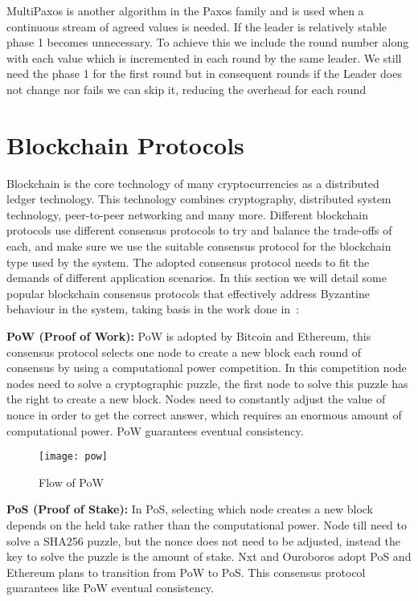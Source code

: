 MultiPaxos is another algorithm in the Paxos family and is used when a
continuous stream of agreed values is needed.
If the leader is relatively stable phase 1 becomes unnecessary. To achieve this
we include the round number along with each value which is incremented in each round
by the same leader. We still need the phase 1 for the first round but in
consequent rounds if the Leader does not change nor fails we can skip it, reducing
the overhead for each round

\section{Blockchain Protocols}\label{sec:blockchain}

Blockchain is the core technology of many cryptocurrencies as a distributed
ledger technology. This technology combines cryptography, distributed system
technology, peer-to-peer networking and many more. Different blockchain
protocols use different consensus protocols to try and balance the trade-offs of
each, and make sure we use the suitable consensus protocol for the blockchain type
used by the system. The adopted consensus protocol needs to fit the demands of
different application scenarios. In this section we will detail some popular
blockchain consensus protocols that effectively address Byzantine behaviour
in the system, taking basis in the work done in~\cite{blockchain_consensus}:

\textbf{PoW (Proof of Work):} PoW is adopted by Bitcoin and Ethereum,
this consensus protocol selects one node to create a new block 
each round of consensus by using a computational power competition. In this
competition node nodes need to solve a cryptographic puzzle, the first node to solve
this puzzle has the right to create a new block. Nodes need to constantly adjust the
value of nonce in order to get the correct answer, which requires an enormous amount
of computational power. PoW guarantees eventual consistency.

\begin{figure}[h]
	\centering
	\texttt{[image: pow]}
	\caption{Flow of PoW}
	\label{fig:pow}
\end{figure}

\textbf{PoS (Proof of Stake):} In PoS, selecting which node creates a new block
depends on the held take rather than the computational power. Node till need to solve
a SHA256 puzzle, but the nonce does not need to be adjusted, instead the key to solve
the puzzle is the amount of stake. Nxt and Ouroboros adopt PoS and Ethereum plans to
transition from PoW to PoS. This consensus protocol guarantees like
PoW eventual consistency. 

